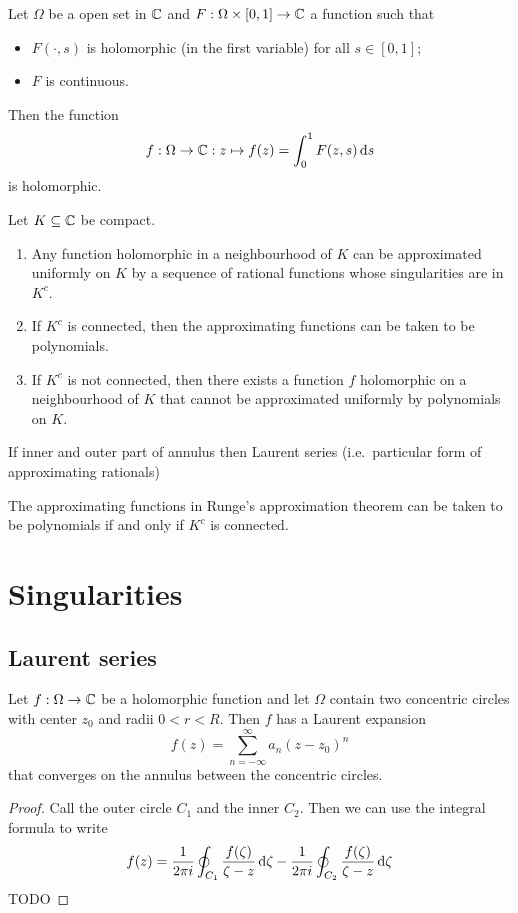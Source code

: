 \begin{proposition}
Let $\Omega$ be a open set in $\mathbb{C}$ and $F: \Omega\times[0,1]\to \mathbb{C}$ a function such that
\begin{itemize}
\item $F(\cdot,s)$ is holomorphic (in the first variable) for all $s\in [0,1]$;
\item $F$ is continuous.
\end{itemize}
Then the function
\[ f: \Omega \to \mathbb{C}: z\mapsto f(z) = \int_0^1F(z,s)\operatorname{d \!}{s} \]
is holomorphic.
\end{proposition}

\begin{proposition}
Let $K\subseteq \mathbb{C}$ be compact.
\begin{enumerate}
\item Any function holomorphic in a neighbourhood of $K$ can be approximated uniformly on $K$ by a sequence of rational functions whose singularities are in $K^c$.
\item If $K^c$ is connected, then the approximating functions can be taken to be polynomials.
\item If $K^c$ is not connected, then there exists a function $f$ holomorphic on a neighbourhood of $K$ that cannot be approximated uniformly by polynomials on $K$.
\end{enumerate}
\end{proposition}
If inner and outer part of annulus then Laurent series (i.e.\ particular form of approximating rationals)


\begin{proposition}
The approximating functions in Runge's approximation theorem can be taken to be polynomials \textup{if and only if} $K^c$ is connected.
\end{proposition}

\section{Singularities}
\subsection{Laurent series}
\begin{proposition}
Let $f:\Omega \to \mathbb{C}$ be a holomorphic function and let $\Omega$ contain two concentric circles with center $z_0$ and radii $0<r< R$. Then $f$ has a Laurent expansion
\[ f(z) = \sum_{n=-\infty}^{\infty}a_n(z-z_0)^n \]
that converges on the annulus between the concentric circles.
\end{proposition}
\begin{proof}
Call the outer circle $C_1$ and the inner $C_2$. Then we can use the integral formula to write
\[ f(z) = \frac{1}{2\pi i}\oint_{C_1}\frac{f(\zeta)}{\zeta - z}\operatorname{d \!}{\zeta} - \frac{1}{2\pi i}\oint_{C_2}\frac{f(\zeta)}{\zeta - z}\operatorname{d \!}{\zeta} \]
TODO
\end{proof}

